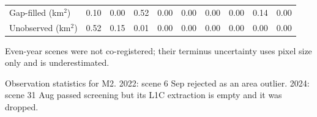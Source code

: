 \documentclass[10pt]{article}
\newcommand{\kmsq}{km$^2$}
\newcommand{\nc}{$^\ddagger$}  %
\begin{document}
\begin{table}
\begin{threeparttable}
\begin{tabular}{l ccccccccc}
Gap-filled (\kmsq)                 & 0.10 & 0.00 & 0.52 & 0.00 & 0.00 & 0.00 & 0.00 & 0.14 & 0.00 \\
Unobserved (\kmsq)                 & 0.52 & 0.15 & 0.01 & 0.00 & 0.00 & 0.00 & 0.00 & 0.00 & 0.00 \\
\bottomrule
\end{tabular}
\begin{tablenotes}\footnotesize
\item[\nc] Even-year scenes were not co-registered; their terminus uncertainty uses pixel size only and is
underestimated.
\item Observation statistics for M2. 2022: scene 6 Sep rejected as an area outlier. 2024: scene 31 Aug
passed screening but its L1C extraction is empty and it was dropped.
\end{tablenotes}
\end{threeparttable}
\end{table}
\end{document}
